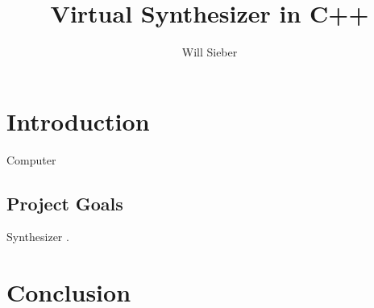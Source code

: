 \documentclass[12pt]{article}
\title{Virtual Synthesizer in C++}
\date{\vspace{-5ex}}
\author{Will Sieber}
\begin{document}
\maketitle

\tableofcontents
\newpage


\section{Introduction}

Computer

\subsection{Project Goals}

Synthesizer \cite{Jagger_2022}.

\section{Conclusion}




\end{document}
